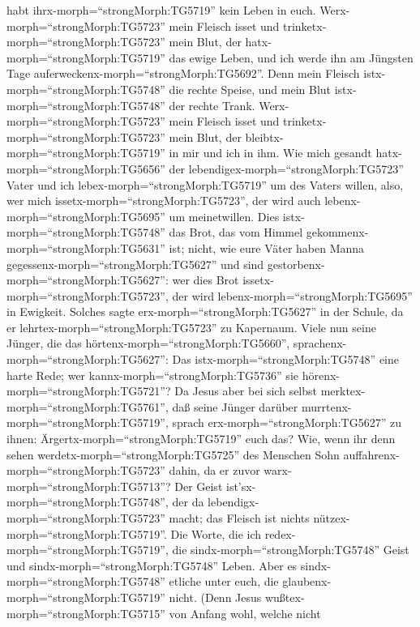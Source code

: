 habt ihrx-morph=``strongMorph:TG5719'' kein Leben in euch. 
Werx-morph=``strongMorph:TG5723'' mein Fleisch isset und
trinketx-morph=``strongMorph:TG5723'' mein Blut, der
hatx-morph=``strongMorph:TG5719'' das ewige Leben, und ich werde ihn am
Jüngsten Tage auferweckenx-morph=``strongMorph:TG5692''. 
Denn mein Fleisch istx-morph=``strongMorph:TG5748'' die rechte Speise,
und mein Blut istx-morph=``strongMorph:TG5748'' der rechte Trank.
 Werx-morph=``strongMorph:TG5723'' mein Fleisch isset und
trinketx-morph=``strongMorph:TG5723'' mein Blut, der
bleibtx-morph=``strongMorph:TG5719'' in mir und ich in ihm.
 Wie mich gesandt hatx-morph=``strongMorph:TG5656'' der
lebendigex-morph=``strongMorph:TG5723'' Vater und ich
lebex-morph=``strongMorph:TG5719'' um des Vaters willen, also, wer mich
issetx-morph=``strongMorph:TG5723'', der wird auch
lebenx-morph=``strongMorph:TG5695'' um meinetwillen.  Dies
istx-morph=``strongMorph:TG5748'' das Brot, das vom Himmel
gekommenx-morph=``strongMorph:TG5631'' ist; nicht, wie eure Väter haben
Manna gegessenx-morph=``strongMorph:TG5627'' und sind
gestorbenx-morph=``strongMorph:TG5627'': wer dies Brot
issetx-morph=``strongMorph:TG5723'', der wird
lebenx-morph=``strongMorph:TG5695'' in Ewigkeit.  Solches
sagte erx-morph=``strongMorph:TG5627'' in der Schule, da er
lehrtex-morph=``strongMorph:TG5723'' zu Kapernaum.  Viele
nun seine Jünger, die das hörtenx-morph=``strongMorph:TG5660'',
sprachenx-morph=``strongMorph:TG5627'': Das
istx-morph=``strongMorph:TG5748'' eine harte Rede; wer
kannx-morph=``strongMorph:TG5736'' sie
hörenx-morph=``strongMorph:TG5721''?  Da Jesus aber bei
sich selbst merktex-morph=``strongMorph:TG5761'', daß seine Jünger
darüber murrtenx-morph=``strongMorph:TG5719'', sprach
erx-morph=``strongMorph:TG5627'' zu ihnen:
Ärgertx-morph=``strongMorph:TG5719'' euch das?  Wie, wenn
ihr denn sehen werdetx-morph=``strongMorph:TG5725'' des Menschen Sohn
auffahrenx-morph=``strongMorph:TG5723'' dahin, da er zuvor
warx-morph=``strongMorph:TG5713''?  Der Geist
ist'sx-morph=``strongMorph:TG5748'', der da
lebendigx-morph=``strongMorph:TG5723'' macht; das Fleisch ist nichts
nützex-morph=``strongMorph:TG5719''. Die Worte, die ich
redex-morph=``strongMorph:TG5719'', die
sindx-morph=``strongMorph:TG5748'' Geist und
sindx-morph=``strongMorph:TG5748'' Leben.  Aber es
sindx-morph=``strongMorph:TG5748'' etliche unter euch, die
glaubenx-morph=``strongMorph:TG5719'' nicht. (Denn Jesus
wußtex-morph=``strongMorph:TG5715'' von Anfang wohl, welche nicht
